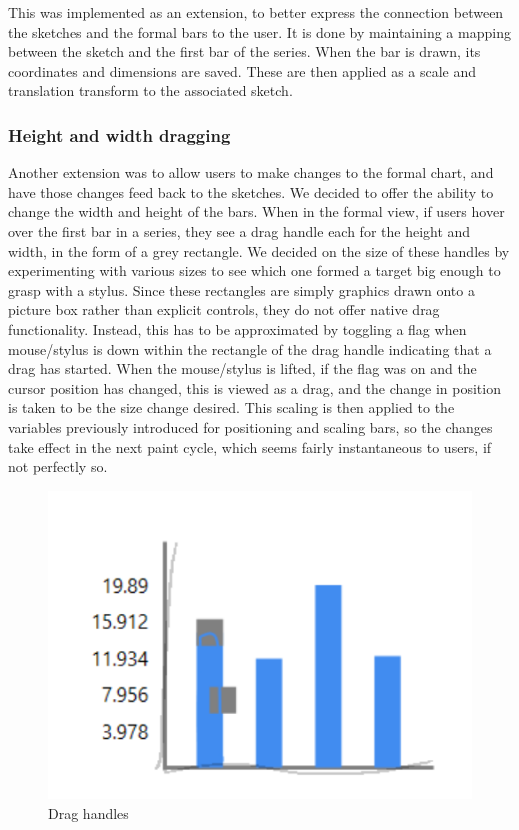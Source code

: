 	This was implemented as an extension, to better express the connection between the sketches and the formal bars to the user. It is done by maintaining a mapping between the sketch and the first bar of the series. When the bar is drawn, its coordinates and dimensions are saved. These are then applied as a scale and translation transform to the associated sketch.
	
	
	\subsubsection{Height and width dragging}
	Another extension was to allow users to make changes to the formal chart, and have those changes feed back to the sketches. We decided to offer the ability to change the width and height of the bars. When in the formal view, if users hover over the first bar in a series, they see a drag handle each for the height and width, in the form of a grey rectangle. We decided on the size of these handles by experimenting with various sizes to see which one formed a target big enough to grasp with a stylus. Since these rectangles are simply graphics drawn onto a picture box rather than explicit controls, they do not offer native drag functionality. Instead, this has to be approximated by toggling a flag when mouse/stylus is down within the rectangle of the drag handle indicating that a drag has started. When the mouse/stylus is lifted, if the flag was on and the cursor position has changed, this is viewed as a drag, and the change in position is taken to be the size change desired. This scaling is then applied to the variables previously introduced for positioning and scaling bars, so the changes take effect in the next paint cycle, which seems fairly instantaneous to users, if not perfectly so.
	
	\begin{figure}
	\includegraphics[scale=1]{draghandles}
	\caption{Drag handles}
	\end{figure}		
	
